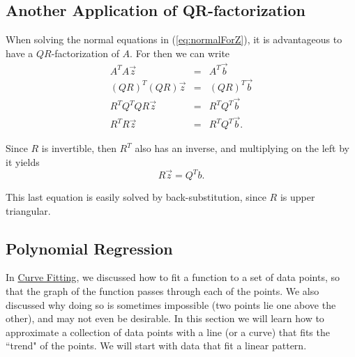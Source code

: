\documentclass{ximera}
\begin{document}
\subsection*{Another Application of QR-factorization}

When solving the normal equations in (\ref{eq:normalForZ}), it is advantageous to have a $QR$-factorization of $A$.  For then we can write
\begin{eqnarray*}
A^TA\vec{z}&=&A^T\vec{b} \\
(QR)^T(QR)\vec{z}&=&(QR)^T\vec{b} \\
R^TQ^TQR\vec{z}&=&R^TQ^T\vec{b} \\
R^TR\vec{z}&=&R^TQ^T\vec{b}.
\end{eqnarray*}

Since $R$ is invertible, then $R^T$ also has an inverse, and multiplying on the left by it yields
$$R\vec{z} = Q^T b.$$

This last equation is easily solved by back-substitution, since $R$ is upper triangular.

\subsection*{Polynomial Regression}
In \href{https://ximera.osu.edu/oerlinalg/LinearAlgebra/APP-0070/main}{Curve Fitting}, we discussed how to fit a function to a set of data points, so that the graph of the function passes through each of the points.  We also discussed why doing so is sometimes impossible (two points lie one above the other), and may not even be desirable.  In this section we will learn how to approximate a collection of data points with a line (or a curve) that fits the ``trend" of the points.  We will start with data that fit a linear pattern.  
\end{document}
